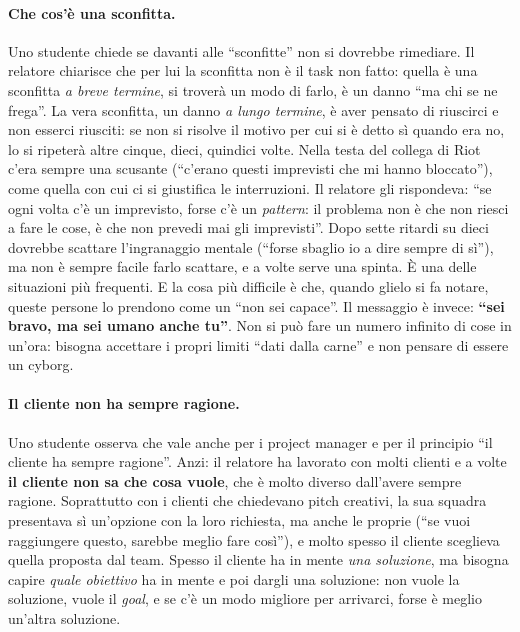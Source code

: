 \paragraph{Che cos'è una sconfitta.} Uno studente chiede se davanti alle
``sconfitte'' non si dovrebbe rimediare. Il relatore chiarisce che per lui la
sconfitta non è il task non fatto: quella è una sconfitta \emph{a breve termine},
si troverà un modo di farlo, è un danno ``ma chi se ne frega''. La vera sconfitta,
un danno \emph{a lungo termine}, è aver pensato di riuscirci e non esserci
riusciti: se non si risolve il motivo per cui si è detto sì quando era no, lo si
ripeterà altre cinque, dieci, quindici volte. Nella testa del collega di Riot c'era
sempre una scusante (``c'erano questi imprevisti che mi hanno bloccato''), come
quella con cui ci si giustifica le interruzioni. Il relatore gli rispondeva: ``se
ogni volta c'è un imprevisto, forse c'è un \emph{pattern}: il problema non è che
non riesci a fare le cose, è che non prevedi mai gli imprevisti''. Dopo sette
ritardi su dieci dovrebbe scattare l'ingranaggio mentale (``forse sbaglio io a
dire sempre di sì''), ma non è sempre facile farlo scattare, e a volte serve una
spinta. È una delle situazioni più frequenti. E la cosa più difficile è che,
quando glielo si fa notare, queste persone lo prendono come un ``non sei capace''.
Il messaggio è invece: \textbf{``sei bravo, ma sei umano anche tu''}. Non si può
fare un numero infinito di cose in un'ora: bisogna accettare i propri limiti ``dati
dalla carne'' e non pensare di essere un cyborg.

\paragraph{Il cliente non ha sempre ragione.} Uno studente osserva che vale anche
per i project manager e per il principio ``il cliente ha sempre ragione''. Anzi:
il relatore ha lavorato con molti clienti e a volte \textbf{il cliente non sa che
cosa vuole}, che è molto diverso dall'avere sempre ragione. Soprattutto con i
clienti che chiedevano pitch creativi, la sua squadra presentava sì un'opzione
con la loro richiesta, ma anche le proprie (``se vuoi raggiungere questo, sarebbe
meglio fare così''), e molto spesso il cliente sceglieva quella proposta dal team.
Spesso il cliente ha in mente \emph{una soluzione}, ma bisogna capire \emph{quale
obiettivo} ha in mente e poi dargli una soluzione: non vuole la soluzione, vuole il
\emph{goal}, e se c'è un modo migliore per arrivarci, forse è meglio un'altra
soluzione.


